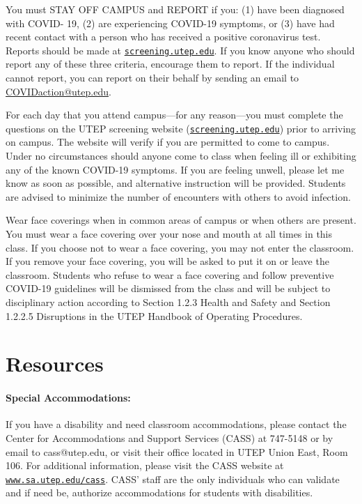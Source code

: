 \documentclass[12pt]{scrartcl}
\begin{document}
You must STAY OFF CAMPUS and REPORT if you:
(1) have been diagnosed with COVID- 19, 
(2) are experiencing COVID-19 symptoms, or 
(3) have had recent contact with a person who has received a positive coronavirus test. 
Reports should be made at \href{http://screening.utep.edu}{\texttt{screening.utep.edu}}. 
If you know anyone who should report any of these three criteria, encourage them to report. 
If the individual cannot report, you can report on their behalf by sending an email to \url{COVIDaction@utep.edu}.

For each day that you attend campus—for any reason—you must complete the questions on the UTEP screening website (\href{http://screening.utep.edu}{\texttt{screening.utep.edu}}) prior to arriving on campus. 
The website will verify if you are permitted to come to campus. 
Under no circumstances should anyone come to class when feeling ill or exhibiting any of the known COVID-19 symptoms. 
If you are feeling unwell, please let me know as soon as possible, 
and alternative instruction will be provided. Students are advised to minimize the number of encounters with others to avoid infection.

Wear face coverings when in common areas of campus or when others are present. 
You must wear a face covering over your nose and mouth at all times in this class. 
If you choose not to wear a face covering, you may not enter the classroom. 
If you remove your face covering, you will be asked to put it on or leave the classroom. 
Students who refuse to wear a face covering and follow preventive COVID-19 guidelines will be dismissed from the class and will be subject to disciplinary action according to Section 1.2.3 Health and Safety and Section 1.2.2.5 Disruptions in the UTEP Handbook of Operating Procedures.


\section{Resources}

\paragraph{Special Accommodations: }
If you have a disability and need classroom accommodations, please contact the Center for Accommodations and Support Services (CASS) at 747-5148 or by email to cass@utep.edu, or visit their office located in UTEP Union East, Room 106. For additional information, please visit the CASS website at \href{http://www.sa.utep.edu/cass}{\texttt{www.sa.utep.edu/cass}}. CASS’ staff are the only individuals who can validate and if need be, authorize accommodations for students with disabilities.
\end{document}
